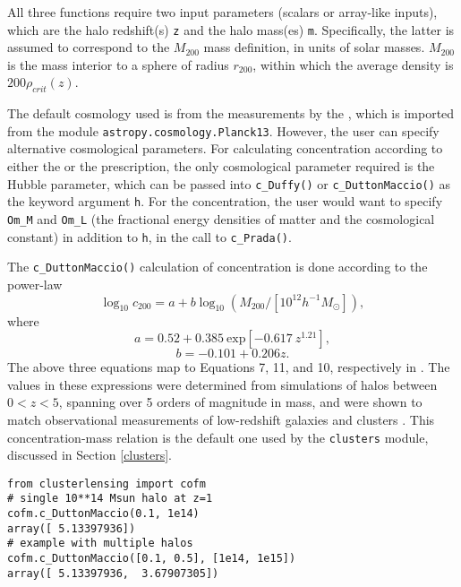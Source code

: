 \documentclass[twocolumn]{aastex6}
\newcommand{\code}{\lstinline[style=codeintext]}
\begin{document}
All three functions require two input parameters (scalars or array-like inputs), which are the halo redshift(s) \code{z} and the halo mass(es) \code{m}. Specifically, the latter is assumed to correspond to the $M_{200}$ mass definition, in units of solar masses. $M_{200}$ is the mass interior to a sphere of radius $r_{200}$, within which the average density is $200\rho_{crit}(z)$.

The default cosmology used is from the measurements by the \citet{PlanckXVI}, which is imported from the module \code{astropy.cosmology.Planck13}. However, the user can specify alternative cosmological parameters. For calculating concentration according to either the \citet{Duffy08} or the \citet{Dutton14} prescription, the only cosmological parameter required is the Hubble parameter, which can be passed into \code{c_Duffy()} or \code{c_DuttonMaccio()} as the keyword argument \code{h}. For the \citet{Prada12} concentration, the user would want to specify \code{Om_M} and \code{Om_L} (the fractional energy densities of matter and the cosmological constant) in addition to \code{h}, in the call to \code{c_Prada()}.

The \code{c_DuttonMaccio()} calculation of concentration is done according to the power-law
\begin{equation}
\log_{10} c_{200} = a + b \log_{10}(M_{200} / [10^{12} h^{-1} M_{\odot}]),
\end{equation}
where
\begin{equation}
a = 0.52 + 0.385\ \mathrm{exp}[-0.617\ z^{1.21}],
\end{equation}
\begin{equation}
b = -0.101 + 0.206 z.
\end{equation}
The above three equations map to Equations 7, 11, and 10, respectively in \citet{Dutton14}. The values in these expressions were determined from simulations of halos between $0 < z < 5$, spanning over 5 orders of magnitude in mass, and were shown to match observational measurements of low-redshift galaxies and clusters \citep{Dutton14}. This concentration-mass relation is the default one used by the \code{clusters} module, discussed in Section \ref{clusters}.

\begin{lstlisting}
from clusterlensing import cofm
# single 10**14 Msun halo at z=1
cofm.c_DuttonMaccio(0.1, 1e14)
array([ 5.13397936])
# example with multiple halos
cofm.c_DuttonMaccio([0.1, 0.5], [1e14, 1e15])
array([ 5.13397936,  3.67907305])
\end{lstlisting}
\end{document}
